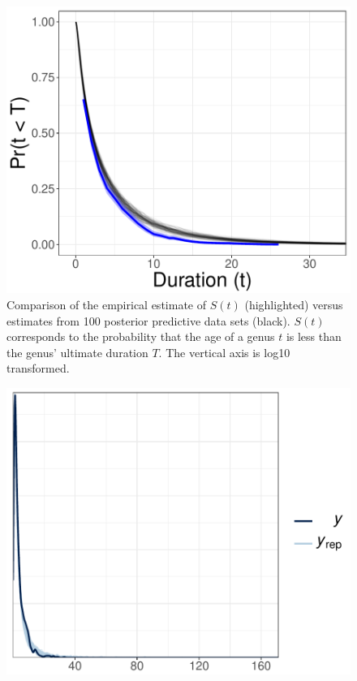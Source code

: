 \documentclass[11pt]{article}
\begin{document}
\begin{figure}[ht]
  \centering
  \includegraphics[height = 0.5\textheight,width=\textwidth,keepaspectratio=true]{figure/survival_curves_cweib_base}
  \caption{Comparison of the empirical estimate of \(S(t)\) (highlighted) versus estimates from 100 posterior predictive data sets (black). \(S(t)\) corresponds to the probability that the age of a genus \(t\) is less than the genus' ultimate duration \(T\). The vertical axis is log10 transformed.}
  \label{fig:surv}
\end{figure}


\begin{figure}[ht]
  \centering
  \includegraphics[height = 0.5\textheight,width=\textwidth,keepaspectratio=true]{figure/ppc_dens_cweib_base}
  \caption{ }
  \label{fig:dens_overlay}
\end{figure}
\end{document}
